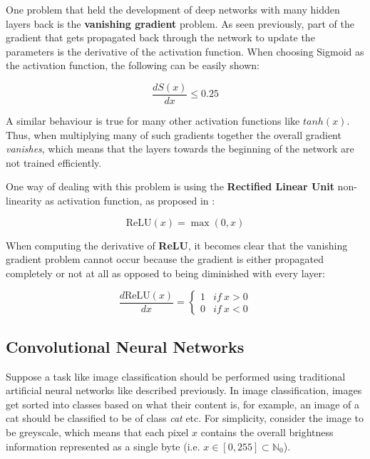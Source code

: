 One problem that held the development of deep networks with many hidden layers back is the \textbf{vanishing gradient} problem.
As seen previously, part of the gradient that gets propagated back through the network to update the parameters is the derivative of the activation function.
When choosing Sigmoid as the activation function, the following can be easily shown:

\begin{equation}
    \frac{dS(x)}{dx} \leq 0.25
\end{equation}

A similar behaviour is true for many other activation functions like $tanh(x)$.
Thus, when multiplying many of such gradients together the overall gradient \textit{vanishes}, which means that the layers towards the beginning of the network are not trained efficiently.

One way of dealing with this problem is using the \textbf{Rectified Linear Unit} non-linearity as activation function, as proposed in \cite{nair_rectified_2010}:

\begin{equation}
    \text{ReLU}(x) = \max (0, x)
\end{equation}

When computing the derivative of \textbf{ReLU}, it becomes clear that the vanishing gradient problem cannot occur because the gradient is either propagated completely or not at all as opposed to being diminished with every layer:

\begin{equation}
    \frac{d \text{ReLU}(x)}{dx} = \begin{cases}
        1 & if ~ x > 0 \\
        0 & if ~ x < 0
    \end{cases}
\end{equation}

\subsection{Convolutional Neural Networks}
Suppose a task like image classification should be performed using traditional artificial neural networks like described previously.
In image classification, images get sorted into classes based on what their content is, for example, an image of a cat should be classified to be of class \textit{cat} etc.
For simplicity, consider the image to be greyscale, which means that each pixel $x$ contains the overall brightness information represented as a single byte (i.e. $x \in [0,255] \subset \mathbb{N}_0$).


